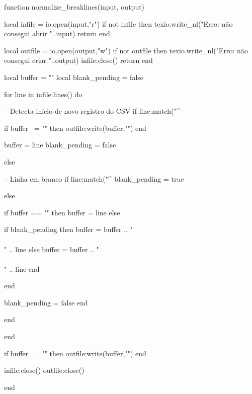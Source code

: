 \begin{luacode*}
function normalize_breaklines(input, output)

  local infile = io.open(input,"r")
  if not infile then
    texio.write_nl("Erro: não consegui abrir "..input)
    return
  end

  local outfile = io.open(output,"w")
  if not outfile then
    texio.write_nl("Erro: não consegui criar "..output)
    infile:close()
    return
  end

  local buffer = ""
  local blank_pending = false

  for line in infile:lines() do

    -- Detecta início de novo registro do CSV
    if line:match("^%

      if buffer ~= "" then
        outfile:write(buffer,"\n")
      end

      buffer = line
      blank_pending = false

    else

      -- Linha em branco
      if line:match("^%
        blank_pending = true

      else

        if buffer == "" then
          buffer = line
        else

          if blank_pending then
            buffer = buffer .. "\\\\[1em]" .. line
          else
            buffer = buffer .. "\\\\" .. line
          end

        end

        blank_pending = false
      end

    end

  end

  if buffer ~= "" then
    outfile:write(buffer,"\n")
  end

  infile:close()
  outfile:close()

end
\end{luacode*}
